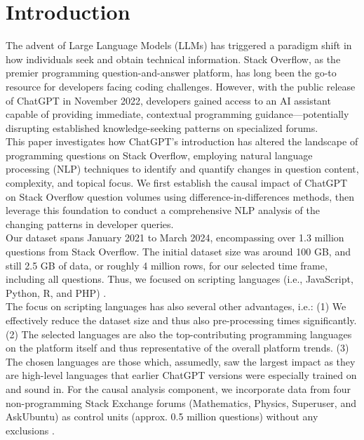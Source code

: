 \section{Introduction}
The advent of Large Language Models (LLMs) has triggered a paradigm shift in how individuals seek and obtain technical information. Stack Overflow, as the premier programming question-and-answer platform, has long been the go-to resource for developers facing coding challenges. However, with the public release of ChatGPT in November 2022, developers gained access to an AI assistant capable of providing immediate, contextual programming guidance—potentially disrupting established knowledge-seeking patterns on specialized forums.\\

This paper investigates how ChatGPT's introduction has altered the landscape of programming questions on Stack Overflow, employing natural language processing (NLP) techniques to identify and quantify changes in question content, complexity, and topical focus. We first establish the causal impact of ChatGPT on Stack Overflow question volumes using difference-in-differences methods, then leverage this foundation to conduct a comprehensive NLP analysis of the changing patterns in developer queries.\\

Our dataset spans January 2021 to March 2024, encompassing over 1.3 million questions from Stack Overflow. The initial dataset size was around 100 GB, and still 2.5 GB of data, or roughly 4 million rows, for our selected time frame, including all questions. Thus, we focused on scripting languages (i.e., JavaScript, Python, R, and PHP) \parencite{stack_overflow_tags_nodate}.\\

The focus on scripting languages has also several other advantages, i.e.: (1) We effectively reduce the dataset size and thus also pre-processing times significantly. (2) The selected languages are also the top-contributing programming languages on the platform itself and thus representative of the overall platform trends. (3) The chosen languages are those which, assumedly, saw the largest impact as they are high-level languages that earlier ChatGPT versions were especially trained on and sound in. For the causal analysis component, we incorporate data from four non-programming Stack Exchange forums (Mathematics, Physics, Superuser, and AskUbuntu) as control units (approx. 0.5 million questions) without any exclusions \parencite{internet_archive_stackexchange_2024}.

